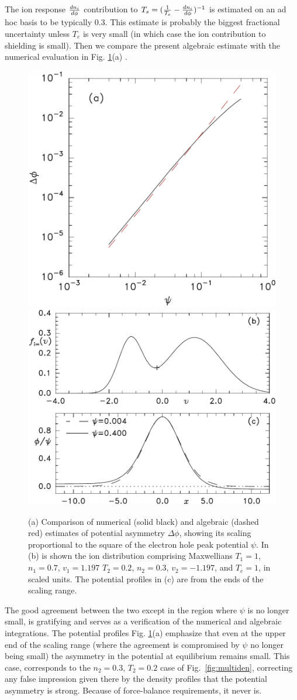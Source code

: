 \documentclass[pre]{revtex4-2}
\begin{document}
The ion response ${dn_i\over d\phi}$ contribution to
$T_s= ({1\over T_e}-{dn_i\over d\phi})^{-1}$ is estimated on an ad hoc
basis to be typically $0.3$. This estimate is probably the biggest fractional
uncertainty unless $T_e$ is very small (in which case the ion
contribution to shielding is small). Then we compare the present
algebraic estimate with the numerical evaluation in
Fig. \ref{fig:scaled}(a) .
\begin{figure}[htp]
  \centering
  \includegraphics[width=0.42\hsize]{scaled}
  \includegraphics[width=0.5\hsize]{phiscaled}
  \caption{(a) Comparison of numerical (solid black) and algebraic
    (dashed red) estimates of potential asymmetry $\Delta\phi$,
    showing its scaling proportional to the square of the electron
    hole peak potential $\psi$. In (b) is shown the ion distribution
    comprising Maxwellians $T_1=1$, $n_1=0.7$, $v_1=1.197$ $T_2=0.2$,
    $n_2=0.3$, $v_2=-1.197$, and $T_e=1$, in scaled units. The
    potential profiles in (c) are from the ends of the scaling range.}
  \label{fig:scaled}
\end{figure}
The good agreement between the two except in the region where $\psi$
is no longer small, is gratifying and serves as a verification of the
numerical and algebraic integrations. The potential profiles
Fig. \ref{fig:scaled}(a) emphasize that even at the upper end of the
scaling range (where the agreement is compromised by $\psi$ no longer
being small) the asymmetry in the potential at equilibrium remains
small. This case, corresponds to the $n_2=0.3$, $T_2=0.2$ case of
Fig.\ \ref{fig:multiden}, correcting any false impression given there
by the density profiles that the potential asymmetry is
strong. Because of force-balance requirements, it never is.
\end{document}
